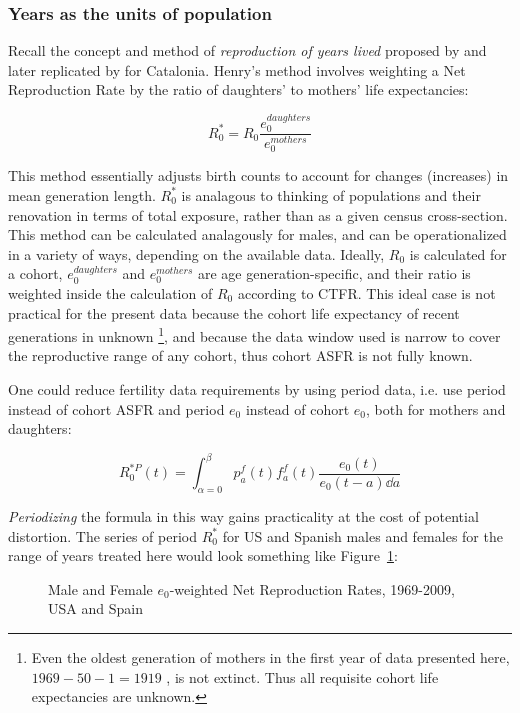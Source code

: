 
\subsubsection{Years as the units of population}
Recall the concept and method of \textit{reproduction of years lived} proposed
by \citet{henry1965reflexions} and later replicated by \citet{cabre1990repro}
for Catalonia. Henry's method involves weighting a Net Reproduction Rate by
the ratio of daughters' to mothers' life expectancies:

\begin{equation}
R_{0}^{\ast} = R_{0} \frac{e_0^{daughters}}{e_0^{mothers}}
\end{equation}

This method essentially adjusts birth counts to account for changes (increases)
in mean generation length. $R_{0}^{\ast}$ is analagous to thinking of populations 
and their renovation in terms of total exposure, rather than as a given census cross-section. This
method can be calculated analagously for males, and can be operationalized 
in a variety of ways, depending on the available data. Ideally, 
$R_{0}$ is calculated for a cohort, $e_0^{daughters}$ and $e_0^{mothers}$ are
age generation-specific, and their ratio is weighted inside the calculation of
$R_0$ according to CTFR. This ideal case is not practical for the present
data because the cohort life expectancy of recent generations in unknown
\footnote{Even the oldest generation of mothers in the first year of data
presented here, $1969-50-1 = 1919$ , is not extinct. Thus all requisite cohort
life expectancies are unknown.}, and because the data window used is narrow to
cover the reproductive range of any cohort, thus cohort ASFR is not fully known.

One could reduce fertility data requirements by using period data, i.e.
use period instead of cohort ASFR and period $e_0$ instead of cohort $e_0$, both
for mothers and daughters:

\begin{equation}
R_{0}^{\ast P}(t) = \int _{\alpha = 0} ^{\beta} p_{a}^{f}(t) f_{a}^{f}(t)
\frac{e_{0}(t)}{e_{0}(t-a) \dd a}
\end{equation}

\textit{Periodizing} the formula in this way gains practicality at the cost of
potential distortion. The series of period $R_0^\ast$ for US and Spanish males
and females for the range of years treated here would look something like
Figure~\ref{fig:R0perHenry}:

\begin{figure}[ht!]
        \centering  
          \caption{Male and Female $e_0$-weighted Net Reproduction Rates,
          1969-2009, USA and Spain}
          \label{fig:R0perHenry}
\end{figure}

